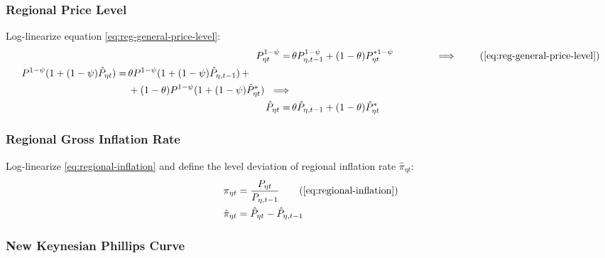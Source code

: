 \documentclass[../thesis.tex]{subfiles}
\begin{document}

\subsubsection*{Regional Price Level}

Log-linearize equation \ref{eq:reg-general-price-level}:
\begin{align}
	P_{\eta t}^{1-\psi} =\, &\theta P_{\eta, t-1}^{1-\psi} + (1-\theta) P_{\eta t}^{\ast 1-\psi} \qquad \qquad \implies \tag{\ref{eq:reg-general-price-level}} \\
	\begin{split} P^{1-\psi} (1 + (1-\psi)\hat{P}_{\eta t}) =\, &\theta P^{1-\psi} (1 + (1-\psi)\hat{P}_{\eta, t-1}) \, + \\ & + (1-\theta) P^{1-\psi} (1 + (1-\psi)\hat{P}_{\eta t}^{\ast}) \ \implies \nonumber \end{split} \\
	\hat{P}_{\eta t} =\, &\theta \hat{P}_{\eta, t-1} + (1-\theta) \hat{P}_{\eta t}^{\ast}
	\label{eq:reg-ll-general-price-level}
\end{align}

		
	\subsubsection*{Regional Gross Inflation Rate}

	Log-linearize \ref{eq:regional-inflation} and define the level deviation of regional inflation rate $\hat{\pi}_{\eta t}$:
	\begin{align}
		\pi_{\eta t} &= \frac{P_{\eta t}}{P_{\eta, t-1}} \tag{\ref{eq:regional-inflation}} \\
		\hat{\pi}_{\eta t} &= \hat{P}_{\eta t} - \hat{P}_{\eta, t-1}
		\label{eq:level-dev-regional-inflation}
	\end{align}


\subsubsection*{New Keynesian Phillips Curve}
\end{document}
